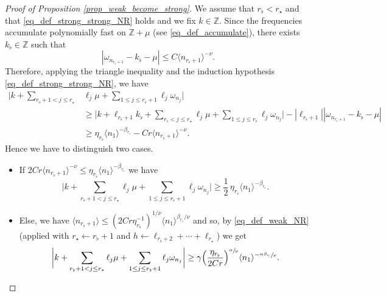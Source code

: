 \begin{proof}[Proof of Proposition \ref{prop_weak_become_strong}]
We assume that $r_\flat < r_\star$ and that \eqref{eq_def_strong_strong_NR} holds and we fix $k\in \mathbb{Z}$.
Since the frequencies accumulate polynomially fast on $\mathbb{Z} + \mu$ (see \eqref{eq_def_accumulate}), there exists $k_\flat \in \mathbb{Z}$ such that
\[
|\omega_{n_{r_\flat +1} } - k_\flat-\mu|\leq C \langle n_{r_\flat +1} \rangle^{-\nu}.
\]
Therefore, applying the triangle inequality and the induction hypothesis \eqref{eq_def_strong_strong_NR}, we have
\begin{equation*}
\begin{split}
\biggl| k + \sum_{{r_{\flat}+1} <j \leq r_\star} &\ell_j \mu + \sum_{1\leq j \leq {r_{\flat}+1} }\ell_j \omega_{n_j} \biggr| \\
&\geq \biggl| k + \ell_{r_\flat+1} k_\flat + \sum_{r_{\flat} <j \leq r_\star} \ell_j \mu + \sum_{1\leq j \leq r_{\flat} }\ell_j \omega_{n_j} \biggr| - |\ell_{r_\flat+1}| |\omega_{n_{r_\flat +1} } - k_\flat -\mu| \\
&\geq \eta_{r_\flat} \langle n_{1} \rangle^{-\beta_{r_\flat}} -C r \langle n_{r_\flat +1} \rangle^{-\nu}.
\end{split}
\end{equation*}
Hence we have to distinguish two cases.
\begin{itemize}
\item
If $2 Cr \langle n_{r_\flat +1} \rangle^{-\nu} \leq \eta_{r_\flat} \langle n_{1} \rangle^{-\beta_{r_\flat}}$ we have
\[
\biggl| k + \sum_{{r_{\flat}+1} <j \leq r_\star} \ell_j \mu + \sum_{1\leq j \leq {r_{\flat}+1} }\ell_j \omega_{n_j} \biggr|\geq \frac12\, \eta_{r_\flat} \langle n_{1} \rangle^{-\beta_{r_\flat}}.
\]
\item
Else, we have $\langle n_{r_\flat +1} \rangle \leq (2Cr\eta_{r_\flat}^{-1})^{1/\nu} \langle n_{1} \rangle^{\beta_{r_\flat}/\nu}$ and so, by \eqref{eq_def_weak_NR} (applied with $r_\star \leftarrow r_\flat+1$ and $h\leftarrow \ell_{r_{\flat}+2} + \cdots + \ell_{r_\star}$) we get
\[
\biggl| k + \sum_{{r_{\flat}+1} <j \leq r_\star} \ell_j \mu + \sum_{1\leq j \leq {r_{\flat}+1} }\ell_j \omega_{n_j} \biggr| \geq \gamma \Big(\frac{\eta_{r_\flat}}{2Cr}\Big)^{\sfrac{\alpha}{\nu}} \langle n_{1} \rangle^{-\sfrac{\alpha\beta_{r_\flat}}{\nu}}.\qedhere
\]
\end{itemize}
\end{proof}

